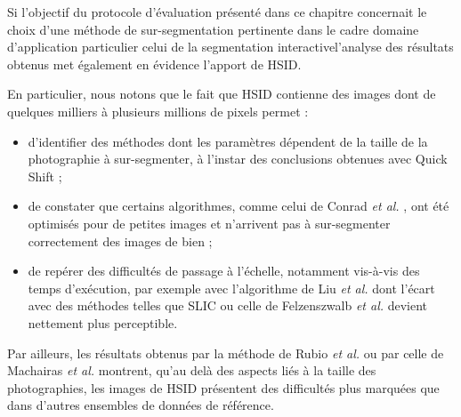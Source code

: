 Si l'objectif du protocole d'évaluation présenté dans ce chapitre concernait le choix d'une méthode de sur-segmentation pertinente dans le cadre  domaine d'application particulier\modif{,} celui de la segmentation interactive\modif{, }l'analyse des résultats obtenus met également en évidence l'apport de HSID. 

En particulier, nous notons que le fait que HSID contienne des images dont  de quelques milliers à plusieurs millions de pixels permet :
\begin{itemize}
\item d'identifier des méthodes dont les paramètres dépendent de la taille de la photographie à sur-segmenter, à l'instar des conclusions obtenues avec Quick Shift \cite{vedaldi2008quick} ;
\item de constater que certains algorithmes, comme celui de Conrad \textit{et al.} \cite{conrad2013contour}, ont été optimisés pour de petites images et n'arrivent pas à sur-segmenter correctement des images de  bien  ;
\item de repérer des difficultés de passage à l'échelle, notamment vis-à-vis des temps d'exécution, par exemple avec l'algorithme de Liu \textit{et al.} \cite{liu2011entropy} dont l'écart avec des méthodes telles que SLIC  ou celle de Felzenszwalb \textit{et al.}  devient nettement plus perceptible.
\end{itemize}

Par ailleurs, les résultats obtenus par la méthode de Rubio \textit{et al.} \cite{rubio2016bass} ou par celle de Machairas \textit{et al.} \cite{machairas2015waterpixels} montrent, qu'au delà des aspects liés à la taille des photographies, les images de HSID présentent des difficultés plus marquées que dans d'autres ensembles de données de référence.


 